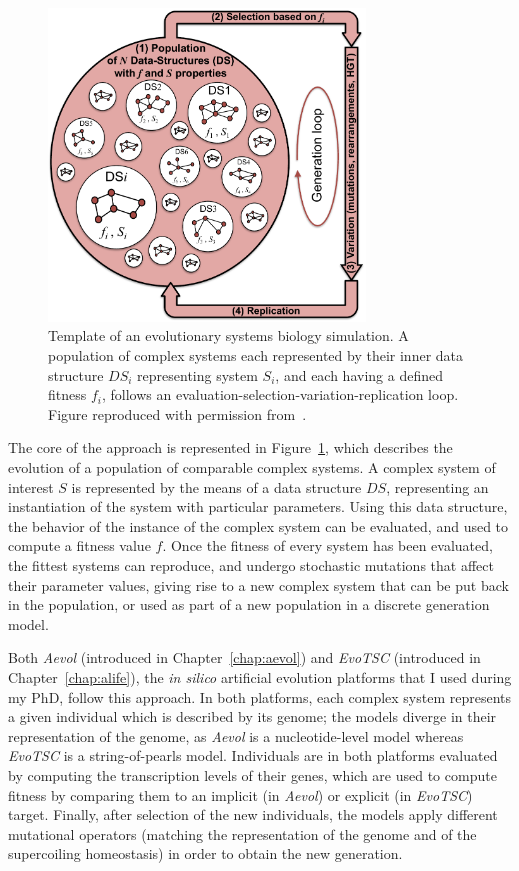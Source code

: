 \begin{figure}
\centering
\includegraphics[width=0.75\textwidth]{background/img/evol_sys_bio.pdf}
\caption[Template of an evolutionary systems biology simulation]{Template of an evolutionary systems biology simulation.
A population of complex systems each represented by their inner data structure $DS_i$ representing system $S_i$, and each having a defined fitness $f_i$, follows an evaluation-selection-variation-replication loop.
Figure reproduced with permission from~\citep{beslon2021}.}
\label{fig:background:evol-sys-bio}
\end{figure}

The core of the approach is represented in Figure~\ref{fig:background:evol-sys-bio}, which describes the evolution of a population of comparable complex systems.
A complex system of interest $S$ is represented by the means of a data structure $DS$, representing an instantiation of the system with particular parameters.
Using this data structure, the behavior of the instance of the complex system can be evaluated, and used to compute a fitness value $f$.
Once the fitness of every system has been evaluated, the fittest systems can reproduce, and undergo stochastic mutations that affect their parameter values, giving rise to a new complex system that can be put back in the population, or used as part of a new population in a discrete generation model.

Both \emph{Aevol} (introduced in Chapter~\ref{chap:aevol}) and \emph{EvoTSC} (introduced in Chapter~\ref{chap:alife}), the \emph{in silico} artificial evolution platforms that I used during my PhD, follow this approach.
In both platforms, each complex system represents a given individual which is described by its genome; the models diverge in their representation of the genome, as \emph{Aevol} is a nucleotide-level model whereas \emph{EvoTSC} is a string-of-pearls model.
Individuals are in both platforms evaluated by computing the transcription levels of their genes, which are used to compute fitness by comparing them to an implicit (in \emph{Aevol}) or explicit (in \emph{EvoTSC}) target.
Finally, after selection of the new individuals, the models apply different mutational operators (matching the representation of the genome and of the supercoiling homeostasis) in order to obtain the new generation.

